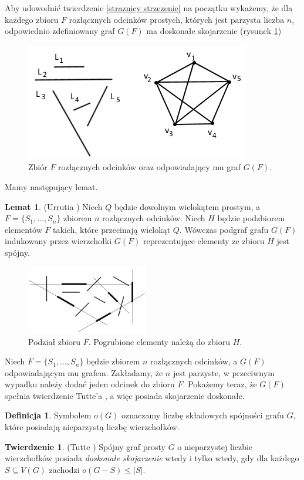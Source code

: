 \documentclass[brudnopis]{xmgr}
\theoremstyle{definition}
\newtheorem{Twierdzenie}{Twierdzenie}
\newtheorem{Lemat}{Lemat}
\newtheorem{Definicja}{Definicja}
\begin{document}
Aby udowodnić twierdzenie \ref{straznicy strzezenie} na początku wykażemy, że dla każdego zbioru $F$ rozłącznych odcinków prostych, których jest parzysta liczba $n$, odpowiednio zdefiniowany graf $G(F)$ ma doskonałe skojarzenie (rysunek \ref{fig:zbior odcinkow rozlacznych})

\begin{figure}[ht!]
 \centering
  \includegraphics{rysunki/g_f.png}
  \caption{Zbiór $F$ rozłącznych odcinków oraz odpowiadający mu graf $G(F)$.}
  \label{fig:zbior odcinkow rozlacznych}
\end{figure} 

Mamy następujący lemat.
\begin{Lemat}\label{podgraf indukowany} (Urrutia \cite{illumination})
Niech $Q$ będzie dowolnym wielokątem prostym, a $F = \{S_1,\ldots,S_n\}$ zbiorem $n$ rozłącznych odcinków. Niech $H$ będzie podzbiorem elementów $F$ takich, które przecinają wielokąt $Q$. Wówczas podgraf grafu $G(F)$ indukowany przez wierzchołki $G(F)$ reprezentujące elementy ze zbioru $H$ jest spójny.
\end{Lemat}
\begin{figure}[ht!]
 \centering
  \includegraphics[height=3cm]{rysunki/podzial_h.png}
  \caption{Podział zbioru $F$. Pogrubione elementy należą do zbioru $H$.}
\end{figure} 
Niech $F = \{S_1,\ldots,S_n\}$ będzie zbiorem $n$ rozłącznych odcinków, a $G(F)$ odpowiadającym mu grafem. Zakładamy, że $n$ jest parzyste, w przeciwnym wypadku należy dodać jeden odcinek do zbioru $F$. Pokażemy teraz, że $G(F)$ spełnia twierdzenie Tutte'a \cite{tutte}, a więc posiada skojarzenie doskonałe.
\begin{Definicja}
	Symbolem $o(G)$ oznaczamy liczbę składowych spójności grafu $G$, które posiadają nieparzystą liczbę wierzchołków.
\end{Definicja}
\begin{Twierdzenie} (Tutte \cite{tutte})
	Spójny graf prosty $G$ o nieparzystej liczbie wierzchołków posiada \emph{doskonałe skojarzenie} wtedy i tylko wtedy, gdy dla każdego $S \subseteq V(G)$ zachodzi $o(G-S) \le |S|$.
\end{Twierdzenie}
\end{document}
